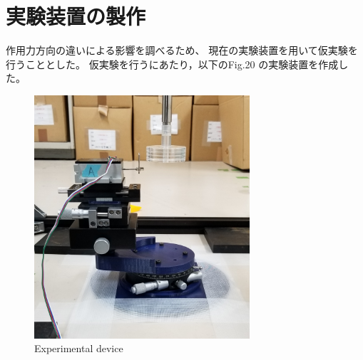 \documentclass[twocolumn,a4j]{jsarticle}
\begin{document}

\newpage

\section{実験装置の製作}
作用力方向の違いによる影響を調べるため、
現在の実験装置を用いて仮実験を行うこととした。
仮実験を行うにあたり，以下のFig.20 の実験装置を作成した。
\begin{figure}[htbp]
    \footnotesize
    \begin{center}
        \includegraphics[width=80mm]{../images/device_1.jpg}
        \caption{Experimental device}
    \end{center}
\end{figure}
\end{document}
